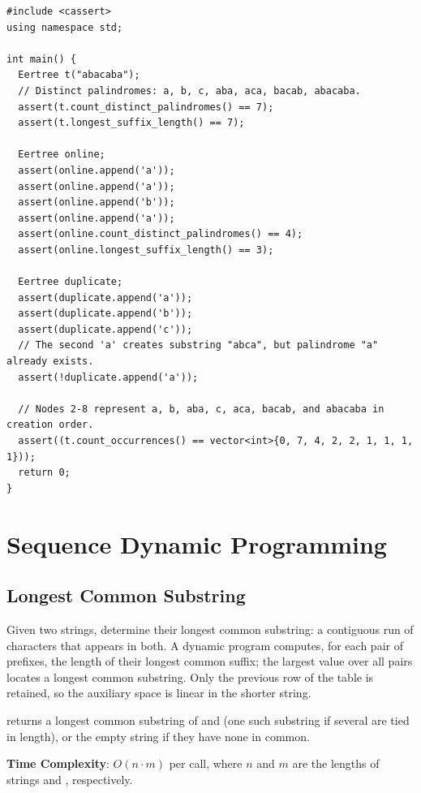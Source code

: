 \begin{lstlisting}[style=cpp]
#include <cassert>
using namespace std;

int main() {
  Eertree t("abacaba");
  // Distinct palindromes: a, b, c, aba, aca, bacab, abacaba.
  assert(t.count_distinct_palindromes() == 7);
  assert(t.longest_suffix_length() == 7);

  Eertree online;
  assert(online.append('a'));
  assert(online.append('a'));
  assert(online.append('b'));
  assert(online.append('a'));
  assert(online.count_distinct_palindromes() == 4);
  assert(online.longest_suffix_length() == 3);

  Eertree duplicate;
  assert(duplicate.append('a'));
  assert(duplicate.append('b'));
  assert(duplicate.append('c'));
  // The second 'a' creates substring "abca", but palindrome "a" already exists.
  assert(!duplicate.append('a'));

  // Nodes 2-8 represent a, b, aba, c, aca, bacab, and abacaba in creation order.
  assert((t.count_occurrences() == vector<int>{0, 7, 4, 2, 2, 1, 1, 1, 1}));
  return 0;
}
\end{lstlisting}

\section{\texorpdfstring{Sequence Dynamic Programming}{3.6 Sequence Dynamic Programming}}
\setcounter{section}{6}
\setcounter{subsection}{0}
\subsection{Longest Common Substring}
\label{sec:3.6.1}
Given two strings, determine their longest common substring: a contiguous run of characters that appears in both. A dynamic program computes, for each pair of prefixes, the length of their longest common suffix; the largest value over all pairs locates a longest common substring. Only the previous row of the table is retained, so the auxiliary space is linear in the shorter string.

\begin{compactitem}
  \item {} returns a longest common substring of  and  (one such substring if several are tied in length), or the empty string if they have none in common.
\end{compactitem}

\textbf{Time Complexity}: $O(n \cdot m)$ per call, where $n$ and $m$ are the lengths of strings  and , respectively.

